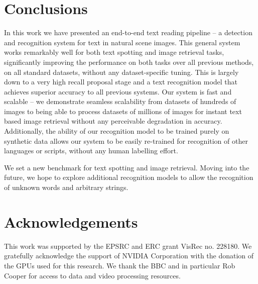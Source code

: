 \documentclass[twocolumn]{svjour3}          \smartqed  \usepackage{epsfig}
\begin{document}
\section{Conclusions}
\label{sec:conclusions}
In this work we have presented an end-to-end text reading pipeline -- a detection and recognition system for text in natural scene images. This general system works remarkably well for both text spotting and image retrieval tasks, significantly improving the performance on both tasks over all previous methods, on all standard datasets, without any dataset-specific tuning. This is largely down to a very high recall proposal stage and a text recognition model that achieves superior accuracy to all previous systems. Our system is fast and scalable -- we demonstrate seamless scalability from datasets of hundreds of images to being able to process datasets of millions of images for instant text based image retrieval without any perceivable degradation in accuracy. Additionally, the ability of our recognition model to be trained purely on synthetic data allows our system to be easily re-trained for recognition of other languages or scripts, without any human labelling effort. 

We set a new benchmark for text spotting and image retrieval. Moving into the future, we hope to explore additional recognition models to allow the recognition of unknown words and arbitrary strings.

\section*{Acknowledgements}
This work was supported by the EPSRC and ERC grant VisRec no. 228180. We gratefully acknowledge the support of NVIDIA Corporation with the donation of the GPUs used for this research. We thank the BBC and in particular Rob Cooper for access to data and video processing resources.



\small
\end{document}
